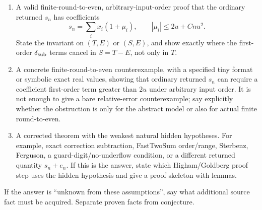 \documentclass{article}
\begin{document}
\begin{enumerate}
\item A valid finite-round-to-even, arbitrary-input-order proof that the
ordinary returned \(s_n\) has coefficients
\[
  s_n=\sum_i x_i(1+\mu_i),\qquad |\mu_i|\le 2u+Cnu^2.
\]
State the invariant on \((T,E)\) or \((S,E)\), and show exactly where the
first-order \(\delta_{\rm sub}\) terms cancel in \(S=T-E\), not only in \(T\).

\item A concrete finite-round-to-even counterexample, with a specified tiny
format or symbolic exact real values, showing that ordinary returned \(s_n\)
can require a coefficient first-order term greater than \(2u\) under arbitrary
input order.  It is not enough to give a bare relative-error counterexample;
say explicitly whether the obstruction is only for the abstract model or also
for actual finite round-to-even.

\item A corrected theorem with the weakest natural hidden hypotheses.  For
example, exact correction subtraction, FastTwoSum order/range, Sterbenz,
Ferguson, a guard-digit/no-underflow condition, or a different returned
quantity \(s_n+e_n\).  If this is the answer, state which Higham/Goldberg proof
step uses the hidden hypothesis and give a proof skeleton with lemmas.
\end{enumerate}

If the answer is ``unknown from these assumptions'', say what additional source
fact must be acquired.  Separate proven facts from conjecture.
\end{document}

